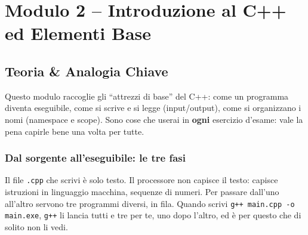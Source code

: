 \chapter{Modulo 2 -- Introduzione al C++ ed Elementi Base}

\section{Teoria \& Analogia Chiave}

Questo modulo raccoglie gli ``attrezzi di base'' del C++: come un programma
diventa eseguibile, come si scrive e si legge (input/output), come si
organizzano i nomi (namespace e scope). Sono cose che userai in
\textbf{ogni} esercizio d'esame: vale la pena capirle bene una volta per tutte.

\subsection*{Dal sorgente all'eseguibile: le tre fasi}

Il file \texttt{.cpp} che scrivi è solo testo. Il processore non capisce il
testo: capisce istruzioni in linguaggio macchina, sequenze di numeri. Per
passare dall'uno all'altro servono tre programmi diversi, in fila. Quando
scrivi \texttt{g++ main.cpp -o main.exe}, \texttt{g++} li lancia tutti e tre per
te, uno dopo l'altro, ed è per questo che di solito non li vedi.

